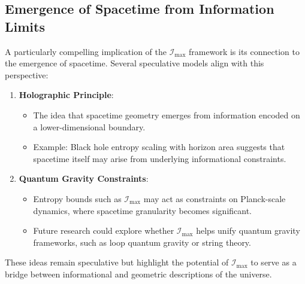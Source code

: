 \documentclass[12pt]{article}
\begin{document}
\subsection{Emergence of Spacetime from Information Limits}
A particularly compelling implication of the \( \mathcal{I}_{\text{max}} \) framework is its connection to the emergence of spacetime. Several speculative models align with this perspective:
\begin{enumerate}
    \item \textbf{Holographic Principle}:
    \begin{itemize}
        \item The idea that spacetime geometry emerges from information encoded on a lower-dimensional boundary.
        \item Example: Black hole entropy scaling with horizon area suggests that spacetime itself may arise from underlying informational constraints.
    \end{itemize}
    \item \textbf{Quantum Gravity Constraints}:
    \begin{itemize}
        \item Entropy bounds such as \( \mathcal{I}_{\text{max}} \) may act as constraints on Planck-scale dynamics, where spacetime granularity becomes significant.
        \item Future research could explore whether \( \mathcal{I}_{\text{max}} \) helps unify quantum gravity frameworks, such as loop quantum gravity or string theory.
    \end{itemize}
\end{enumerate}

These ideas remain speculative but highlight the potential of \( \mathcal{I}_{\text{max}} \) to serve as a bridge between informational and geometric descriptions of the universe.
\end{document}
